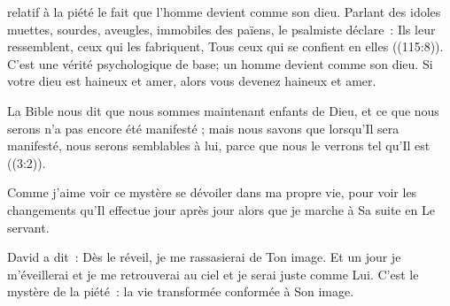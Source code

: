 


 relatif à la piété
 \ocadr le fait que l'homme devient comme son dieu.
 Parlant des idoles muettes, sourdes, aveugles, immobiles des païens,
 le psalmiste déclare~: 
 \og Ils leur ressemblent, ceux qui les fabriquent,
 Tous ceux qui se confient en elles \fg{} ((115:8)).
 C'est une vérité psychologique de base;
 un homme devient comme son dieu.
 Si votre dieu est haineux et amer, alors vous devenez haineux et amer.


La Bible nous dit que \og nous 
 sommes maintenant enfants de Dieu, et ce que nous serons n'a pas encore
 été manifesté ; mais nous savons que lorsqu'Il sera manifesté,
 nous serons semblables à lui, parce que nous le verrons
 tel qu'Il est \fg{} ((3:2)).

Comme j'aime voir ce mystère se dévoiler dans ma propre vie,
 pour voir les changements qu'Il effectue jour après jour
 alors que je marche à Sa suite en Le servant.

David a dit~: 
 \og Dès le réveil, je me rassasierai de Ton image. \fg{}
 Et un jour je m'éveillerai et je me retrouverai au ciel
 et je serai juste comme Lui. C'est le mystère de la piété~:
 la vie transformée conformée à Son image.

\dvrule


